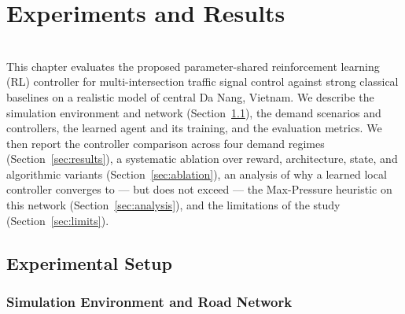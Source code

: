 
\chapter{Experiments and Results}

\noindent{}\\[1em]

This chapter evaluates the proposed parameter-shared reinforcement learning (RL)
controller for multi-intersection traffic signal control against strong classical
baselines on a realistic model of central Da Nang, Vietnam. We describe the simulation
environment and network (Section~\ref{sec:setup}), the demand scenarios and controllers,
the learned agent and its training, and the evaluation metrics. We then report the
controller comparison across four demand regimes (Section~\ref{sec:results}), a
systematic ablation over reward, architecture, state, and algorithmic variants
(Section~\ref{sec:ablation}), an analysis of why a learned local controller converges to
--- but does not exceed --- the Max-Pressure heuristic on this network
(Section~\ref{sec:analysis}), and the limitations of the study
(Section~\ref{sec:limits}).

\section{Experimental Setup}
\label{sec:setup}

\subsection{Simulation Environment and Road Network}

